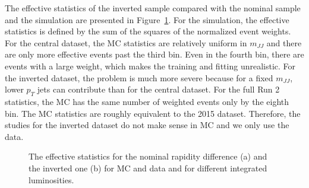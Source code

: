 The effective statistics of the inverted sample compared with the nominal sample and the simulation are presented in Figure~\ref{fig:CWoLa:effectivestats}.   For the simulation, the effective statistics is defined by the sum of the squares of the normalized event weights.  For the central dataset, the MC statistics are relatively uniform in $m_{JJ}$ and there are only more effective events past the third bin.  Even in the fourth bin, there are events with a large weight, which makes the training and fitting unrealistic.  For the inverted dataset, the problem is much more severe because for a fixed $m_{JJ}$, lower $p_T$ jets can contribute than for the central dataset.  For the full Run 2 statistics, the MC has the same number of weighted events only by the eighth bin.   The MC statistics are roughly equivalent to the 2015 dataset.  Therefore, the studies for the inverted dataset do not make sense in MC and we only use the data.

\begin{figure}[h!]
\centering
{}
\caption{The effective statistics for the nominal rapidity difference (a) and the inverted one (b) for MC and data and for different integrated luminosities.}
\label{fig:CWoLa:effectivestats}
\end{figure}

